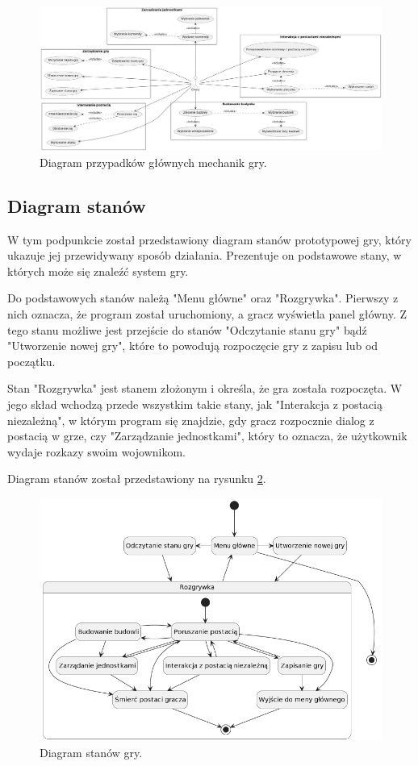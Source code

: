\begin{figure}[!htbp]
    \centering
    \includegraphics[width=1.0\textwidth]{images/diagrams/usecase.jpg}
    \caption{Diagram przypadków głównych mechanik gry.}\label{fig:usecases_d}
\end{figure}
\FloatBarrier

\subsection{Diagram stanów}\label{ss:state}
W tym podpunkcie został przedstawiony diagram stanów prototypowej gry, który ukazuje jej przewidywany sposób działania.
Prezentuje on podstawowe stany, w których może się znaleźć system gry.

Do podstawowych stanów należą "Menu główne" oraz "Rozgrywka". Pierwszy z nich oznacza, że program został uruchomiony, a
gracz wyświetla panel główny. Z tego stanu możliwe jest przejście do stanów "Odczytanie stanu gry" bądź "Utworzenie
nowej gry", które to powodują rozpoczęcie gry z zapisu lub od początku.

Stan "Rozgrywka" jest stanem złożonym i określa, że gra została rozpoczęta. W jego skład wchodzą przede wszystkim takie
stany, jak "Interakcja z postacią niezależną", w którym program się znajdzie, gdy gracz rozpocznie dialog z postacią w grze,
czy "Zarządzanie jednostkami", który to oznacza, że użytkownik wydaje rozkazy swoim wojownikom.

Diagram stanów został przedstawiony na rysunku \ref{fig:states_d}.

\begin{figure}[!htbp]
    \centering
    \includegraphics[width=1.0\textwidth]{images/diagrams/state.jpg}
    \caption{Diagram stanów gry.}\label{fig:states_d}
\end{figure}
\FloatBarrier

